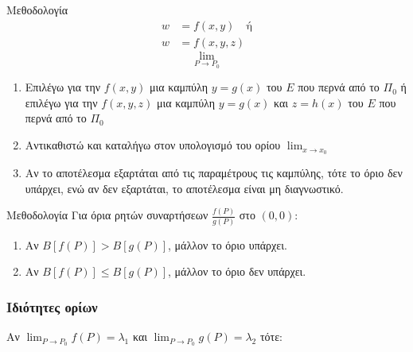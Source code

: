 \documentclass[11pt,a4paper,titlepage,draft]{article}
\begin{document}
\begin{infobox}{Μεθοδολογία}
\begin{align*}
w&=f(x,y) \quad \text{ή}\\
w&=f(x,y,z)
\end{align*}
\[ \lim_{P\to P_0} \]
\tcblower
\begin{enumerate}
\item Επιλέγω για την \(f(x,y)\) μια καμπύλη \(y=g(x)\) του \(Ε\) που περνά από το \(Π_0\) ή \\ επιλέγω για την \(f(x,y,z)\) μια καμπύλη \(y=g(x)\) και \(z=h(x)\) του \(Ε\) που περνά από το \(Π_0\)
\item Αντικαθιστώ και καταλήγω στον υπολογισμό του ορίου \(\lim_{x \to x_0}\)
\item Αν το αποτέλεσμα εξαρτάται από τις παραμέτρους τις καμπύλης, τότε το όριο δεν υπάρχει, ενώ αν δεν εξαρτάται, το αποτέλεσμα είναι μη διαγνωστικό.
\end{enumerate}
\end{infobox}

\begin{infobox}{Μεθοδολογία}
Για όρια ρητών συναρτήσεων \(\frac{f(P)}{g(P)}\) στο \((0,0)\):
\tcblower
\begin{enumerate}
\item Αν \(B \left[ f(P) \right] > B \left[ g(P) \right]\), μάλλον το όριο υπάρχει.
\item Αν \(B \left[ f(P) \right] \leq B \left[ g(P) \right]\), μάλλον το όριο δεν υπάρχει.
\end{enumerate}
\end{infobox}

\subsubsection{Ιδιότητες ορίων}

Αν \( \lim_{P \to P_0} f(P) = \lambda_1\) και \( \lim_{P \to P_0} g(P) = \lambda_2\) τότε:
\end{document}
